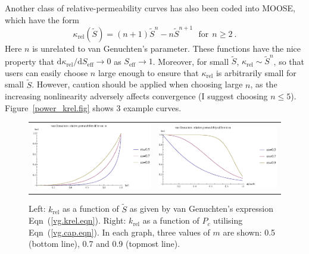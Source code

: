 \documentclass[]{scrreprt}
\begin{document}
Another class of relative-permeability curves has also been coded into
MOOSE, which have the form
\begin{equation}
\kappa_{\mathrm{rel}}(\tilde{S}) = (n+1)\tilde{S}^{n} - n
\tilde{S}^{n+1} \ \ \ \mbox{for}\ \ n\geq 2 \ .
\label{power.krel.eqn}
\end{equation}
Here $n$ is unrelated to van Genuchten's parameter.  These functions
have the nice property that
$\mathrm{d}\kappa_{\mathrm{rel}}/\mathrm{d} S_{\mathrm{eff}}
\rightarrow 0$ as $S_{\mathrm{eff}}\rightarrow 1$.  Moreover, for
small $\tilde{S}$, $\kappa_{\mathrm{rel}} \sim \tilde{S}^{n}$, so that
users can easily choose $n$ large enough to ensure that
$\kappa_{\mathrm{rel}}$ is arbitrarily small for small $\tilde{S}$.
However, caution should be applied when choosing large $n$, as the
increasing nonlinearity adversely affects convergence (I suggest
choosing $n \leq 5$).
Figure~\ref{power_krel.fig} shows 3 example curves.

\begin{figure}[htb]
\centering
\begin{tabular}{cc}
\includegraphics[width=7cm]{van_genuchten_kr.eps} &
\includegraphics[width=7cm]{van_genuchten_kr_pc.eps}
\end{tabular}
\caption{Left: $k_{\mathrm{rel}}$ as a function of $\tilde{S}$
  as given   by van Genuchten's expression Eqn~(\ref{vg.krel.eqn}).
  Right: $k_{\mathrm{rel}}$ as a function of $P_{c}$ utilising
  Eqn~(\ref{vg.cap.eqn}).  In each graph, three values
  of $m$ are shown: 0.5 (bottom line), 0.7 and 0.9 (topmost line).}
\label{van_genuchten_krel.fig}
\end{figure}
\end{document}
